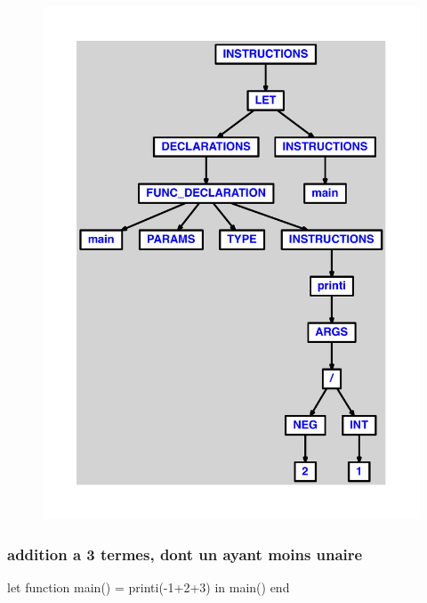 \documentclass{article}
\begin{document}
\begin{figure}[H]\centering\includegraphics[max width=\textwidth]{ast/ast_66.pdf}\end{figure}\subsubsection{addition a 3 termes, dont un ayant moins unaire}
\begin{verbatimtab}
let
	function main() = printi(-1+2+3)
in main() end
\end{verbatimtab}
\end{document}
